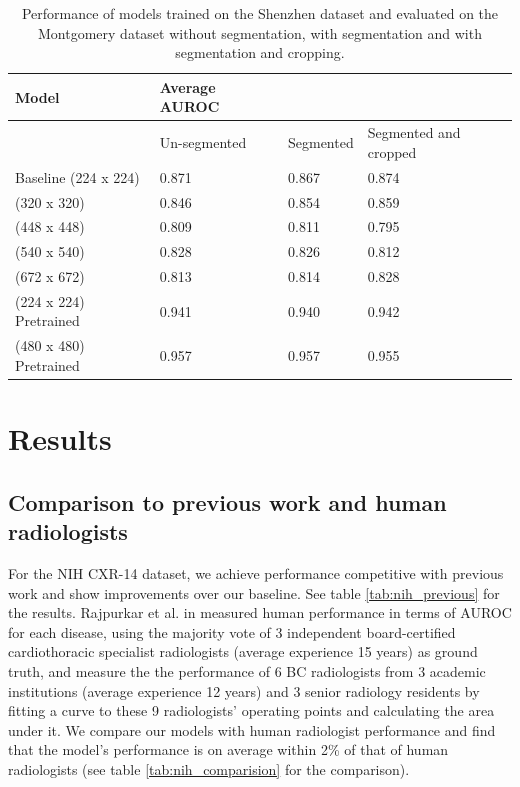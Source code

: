 \documentclass[12pt,oneside,a4paper]{report}
\begin{document}
\begin{table}
\centering
\begin{tabular}{@{}llll@{}}
\toprule
\textbf{Model}         & \textbf{Average AUROC} &           & \\
\midrule
                       & Un-segmented           & Segmented & Segmented and cropped \\
\midrule
Baseline (224 x 224)   & 0.871                  & 0.867     & 0.874                 \\
(320 x 320)            & 0.846                  & 0.854     & 0.859                 \\
(448 x 448)            & 0.809                  & 0.811     & 0.795                 \\
(540 x 540)            & 0.828                  & 0.826     & 0.812                 \\
(672 x 672)            & 0.813                  & 0.814     & 0.828                 \\
(224 x 224) Pretrained & 0.941                  & 0.940     & 0.942                 \\
(480 x 480) Pretrained & 0.957                  & 0.957     & 0.955                 \\
\bottomrule
\end{tabular}
\caption{Performance of models trained on the Shenzhen dataset and evaluated on the Montgomery dataset without segmentation, with segmentation and with segmentation and cropping.}
  \label{tab:mc_segmentation}
\end{table}

\chapter{Results\label{res}}
\section{Comparison to previous work and human radiologists}
For the NIH CXR-14 dataset, we achieve performance competitive with previous
work and show improvements over our baseline. See table \ref{tab:nih_previous} for
the results. Rajpurkar et al. in \cite{Rajpurkar2018a} measured human
performance in terms of AUROC for each disease, using the majority vote of 3
independent board-certified cardiothoracic specialist radiologists (average
experience 15 years) as ground truth, and measure the the performance of 6 BC
radiologists from 3 academic institutions (average experience 12 years) and 3
senior radiology residents by fitting a curve to these 9 radiologists' operating
points and calculating the area under it. We compare our models with human
radiologist performance and find that the model's performance is on average
within 2\% of that of human radiologists (see table
\ref{tab:nih_comparision} for the comparison).\\
\end{document}
